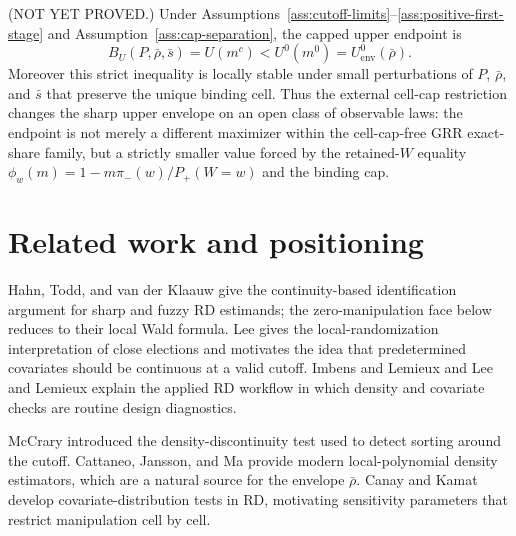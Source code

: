 \documentclass[11pt]{article}
\theoremstyle{definition}
\theoremstyle{plain}
\theoremstyle{remark}
\begin{document}
\begin{conjecture}\label{conj:cap-separation}
(NOT YET PROVED.)  Under Assumptions~\ref{ass:cutoff-limits}--\ref{ass:positive-first-stage}
and Assumption~\ref{ass:cap-separation}, the capped upper endpoint is
\[
  B_U(P,\bar\rho,\bar s)=U(m^c)<U^0(m^0)=U^0_{\mathrm{env}}(\bar\rho).
\]
Moreover this strict inequality is locally stable under small perturbations of \(P\),
\(\bar\rho\), and \(\bar s\) that preserve the unique binding cell.  Thus the external
cell-cap restriction changes the sharp upper envelope on an open class of observable laws:
the endpoint is not merely a different maximizer within the cell-cap-free GRR exact-share
family, but a strictly smaller value forced by the retained-\(W\) equality
\(\phi_w(m)=1-m\pi_-(w)/P_+(W=w)\) and the binding cap.
\end{conjecture}

\section{Related work and positioning}
Hahn, Todd, and van der Klaauw \cite{HahnToddVanDerKlaauw2001} give the continuity-based
identification argument for sharp and fuzzy RD estimands; the zero-manipulation face below
reduces to their local Wald formula.  Lee \cite{Lee2008} gives the local-randomization
interpretation of close elections and motivates the idea that predetermined covariates
should be continuous at a valid cutoff.  Imbens and Lemieux \cite{ImbensLemieux2008} and
Lee and Lemieux \cite{LeeLemieux2010} explain the applied RD workflow in which density and
covariate checks are routine design diagnostics.

McCrary \cite{McCrary2008} introduced the density-discontinuity test used to detect sorting
around the cutoff.  Cattaneo, Jansson, and Ma \cite{CattaneoJanssonMa2020} provide modern
local-polynomial density estimators, which are a natural source for the envelope
\(\bar\rho\).  Canay and Kamat \cite{CanayKamat2018} develop covariate-distribution tests
in RD, motivating sensitivity parameters that restrict manipulation cell by cell.
\end{document}
